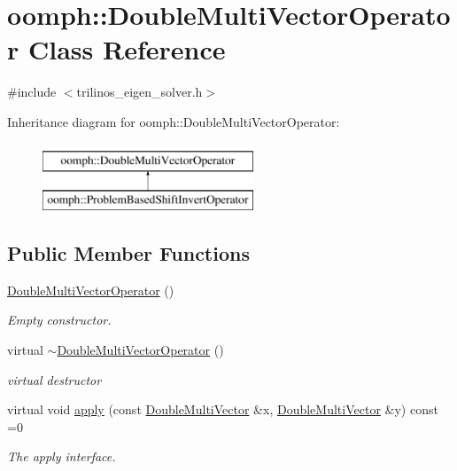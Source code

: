 \hypertarget{classoomph_1_1DoubleMultiVectorOperator}{}\section{oomph\+:\+:Double\+Multi\+Vector\+Operator Class Reference}
\label{classoomph_1_1DoubleMultiVectorOperator}


{\ttfamily \#include $<$trilinos\+\_\+eigen\+\_\+solver.\+h$>$}

Inheritance diagram for oomph\+:\+:Double\+Multi\+Vector\+Operator\+:\begin{figure}[H]
\begin{center}
\leavevmode
\includegraphics[height=2.000000cm]{classoomph_1_1DoubleMultiVectorOperator}
\end{center}
\end{figure}
\subsection*{Public Member Functions}
\begin{DoxyCompactItemize}
\item 
\hyperlink{classoomph_1_1DoubleMultiVectorOperator_a21b0b94da2dc0b7303e3d8cb58fb8acb}{Double\+Multi\+Vector\+Operator} ()
\begin{DoxyCompactList}\small\item\em Empty constructor. \end{DoxyCompactList}\item 
virtual \hyperlink{classoomph_1_1DoubleMultiVectorOperator_a4c3c0579a42bd89650c9701d3a07f31b}{$\sim$\+Double\+Multi\+Vector\+Operator} ()
\begin{DoxyCompactList}\small\item\em virtual destructor \end{DoxyCompactList}\item 
virtual void \hyperlink{classoomph_1_1DoubleMultiVectorOperator_a58ada02505907b7b51e336ee1d79031c}{apply} (const \hyperlink{classoomph_1_1DoubleMultiVector}{Double\+Multi\+Vector} \&x, \hyperlink{classoomph_1_1DoubleMultiVector}{Double\+Multi\+Vector} \&y) const =0
\begin{DoxyCompactList}\small\item\em The apply interface. \end{DoxyCompactList}\end{DoxyCompactItemize}



